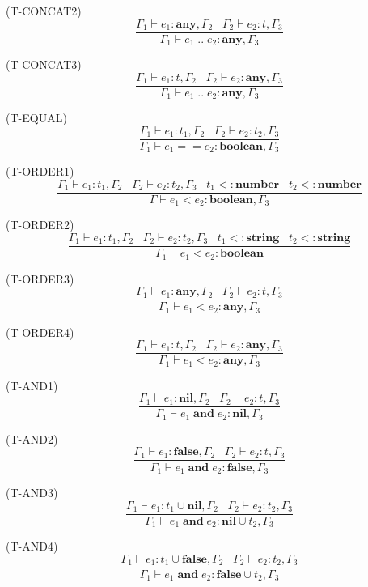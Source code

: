 \documentclass{paper}
\newcommand{\Any}{\mathbf{any}}
\newcommand{\Nil}{\mathbf{nil}}
\newcommand{\False}{\mathbf{false}}
\newcommand{\Boolean}{\mathbf{boolean}}
\newcommand{\Number}{\mathbf{number}}
\newcommand{\String}{\mathbf{string}}
\newcommand{\mylabel}[1]{\; (\textsc{#1})}
\newcommand{\env}{\Gamma}
\newcommand{\subtype}{<:}
\begin{document}
\mylabel{T-CONCAT2}
\[
\dfrac{\env_{1} \vdash e_{1}:\Any, \env_{2} \;\;\;
       \env_{2} \vdash e_{2}:t, \env_{3}}
      {\env_{1} \vdash e_{1} \; {..} \; e_{2}:\Any, \env_{3}}
\]

\mylabel{T-CONCAT3}
\[
\dfrac{\env_{1} \vdash e_{1}:t, \env_{2} \;\;\;
       \env_{2} \vdash e_{2}:\Any, \env_{3}}
      {\env_{1} \vdash e_{1} \; {..} \; e_{2}:\Any, \env_{3}}
\]

\mylabel{T-EQUAL}
\[
\dfrac{\env_{1} \vdash e_{1}:t_{1}, \env_{2} \;\;\;
       \env_{2} \vdash e_{2}:t_{2}, \env_{3}}
      {\env_{1} \vdash e_{1} == e_{2}:\Boolean, \env_{3}}
\]

\mylabel{T-ORDER1}
\[
\dfrac{\env_{1} \vdash e_{1}:t_{1}, \env_{2} \;\;\;
       \env_{2} \vdash e_{2}:t_{2}, \env_{3} \;\;\;
       t_{1} \subtype \Number \;\;\;
       t_{2} \subtype \Number}
      {\env \vdash e_{1} < e_{2}:\Boolean, \env_{3}}
\]

\mylabel{T-ORDER2}
\[
\dfrac{\env_{1} \vdash e_{1}:t_{1}, \env_{2} \;\;\;
       \env_{2} \vdash e_{2}:t_{2}, \env_{3} \;\;\;
       t_{1} \subtype \String \;\;\;
       t_{2} \subtype \String}
      {\env_{1} \vdash e_{1} < e_{2}:\Boolean}
\]

\mylabel{T-ORDER3}
\[
\dfrac{\env_{1} \vdash e_{1}:\Any, \env_{2} \;\;\;
       \env_{2} \vdash e_{2}:t, \env_{3}}
      {\env_{1} \vdash e_{1} < e_{2}:\Any, \env_{3}}
\]

\mylabel{T-ORDER4}
\[
\dfrac{\env_{1} \vdash e_{1}:t, \env_{2} \;\;\;
       \env_{2} \vdash e_{2}:\Any, \env_{3}}
      {\env_{1} \vdash e_{1} < e_{2}:\Any, \env_{3}}
\]

\mylabel{T-AND1}
\[
\dfrac{\env_{1} \vdash e_{1}:\Nil, \env_{2} \;\;\;
       \env_{2} \vdash e_{2}:t, \env_{3}}
      {\env_{1} \vdash e_{1} \; \mathbf{and} \; e_{2}:\Nil, \env_{3}}
\]

\mylabel{T-AND2}
\[
\dfrac{\env_{1} \vdash e_{1}:\False, \env_{2} \;\;\;
       \env_{2} \vdash e_{2}:t, \env_{3}}
      {\env_{1} \vdash e_{1} \; \mathbf{and} \; e_{2}:\False, \env_{3}}
\]

\mylabel{T-AND3}
\[
\dfrac{\env_{1} \vdash e_{1}:t_{1} \cup \Nil, \env_{2} \;\;\;
       \env_{2} \vdash e_{2}:t_{2}, \env_{3}}
      {\env_{1} \vdash e_{1} \; \mathbf{and} \; e_{2}:\Nil \cup t_{2}, \env_{3}}
\]

\mylabel{T-AND4}
\[
\dfrac{\env_{1} \vdash e_{1}:t_{1} \cup \False, \env_{2} \;\;\;
       \env_{2} \vdash e_{2}:t_{2}, \env_{3}}
      {\env_{1} \vdash e_{1} \; \mathbf{and} \; e_{2}:\False \cup t_{2}, \env_{3}}
\]
\end{document}
